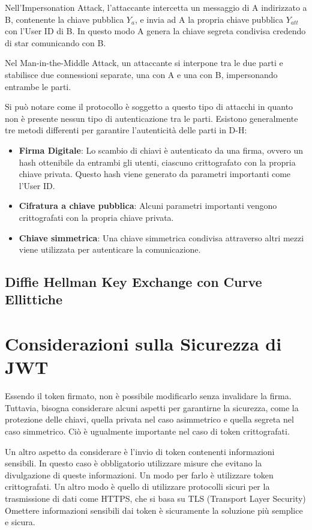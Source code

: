 \documentclass{article}
\begin{document}
Nell'Impersonation Attack, l'attaccante intercetta un messaggio di A indirizzato a B, contenente la chiave pubblica $Y_a$, e invia ad A la propria chiave pubblica $Y_{att}$ con l'User ID di B.
In questo modo A genera la chiave segreta condivisa credendo di star comunicando con B.

Nel Man-in-the-Middle Attack, un attaccante si interpone tra le due parti e stabilisce due connessioni separate, una con A e una con B, impersonando entrambe le parti.

Si può notare come il protocollo è soggetto a questo tipo di attacchi in quanto non è presente nessun tipo di autenticazione tra le parti.
Esistono generalmente tre metodi differenti per garantire l'autenticità delle parti in D-H:
\begin{itemize}
	\item \textbf{Firma Digitale}: Lo scambio di chiavi è autenticato da una firma, ovvero un hash ottenibile da entrambi gli utenti, ciascuno crittografato con la propria chiave privata. Questo hash viene generato da parametri importanti come l'User ID.
	\item \textbf{Cifratura a chiave pubblica}: Alcuni parametri importanti vengono crittografati con la propria chiave privata.
	\item \textbf{Chiave simmetrica}: Una chiave simmetrica condivisa attraverso altri mezzi viene utilizzata per autenticare la comunicazione.
\end{itemize}

\subsection{Diffie Hellman Key Exchange con Curve Ellittiche}

\section{Considerazioni sulla Sicurezza di JWT}
Essendo il token firmato, non è possibile modificarlo senza invalidare la firma.
Tuttavia, bisogna considerare alcuni aspetti per garantirne la sicurezza, come la protezione delle chiavi, quella privata nel caso asimmetrico e quella segreta nel caso simmetrico.
Ciò è ugualmente importante nel caso di token crittografati.

Un altro aspetto da considerare è l'invio di token contenenti informazioni sensibili.
In questo caso è obbligatorio utilizzare misure che evitano la divulgazione di queste informazioni.
Un modo per farlo è utilizzare token crittografati.
Un altro modo è quello di utilizzare protocolli sicuri per la trasmissione di dati come HTTPS, che si basa su TLS (Transport Layer Security)
Omettere informazioni sensibili dai token è sicuramente la soluzione più semplice e sicura.
\end{document}
